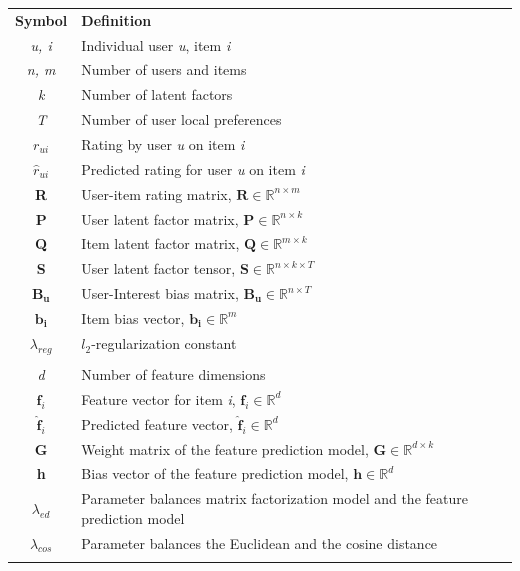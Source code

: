 \begin{table}[p]
	\begin{center}
		\begin{tabularx}{0.9\linewidth}{cX}
			\hline \hline \textbf{Symbol} & \textbf{Definition} \\
			\textit{u, i} & Individual user \textit{u}, item \textit{i} \\
			\textit{n, m} & Number of users and items \\
			\textit{k} & Number of latent factors \\
			\textit{T} & Number of user local preferences \\
			$\mathit{r_{ui}}$ & Rating by user \textit{u} on item \textit{i}\\
			$\mathit{\hat{r}_{ui}}$ & Predicted rating for user \textit{u} on item \textit{i} \\
			\textbf{R} & User-item rating matrix, $\mathbf{R} \in \mathds{R}^{n \times m}$ \\
			\textbf{P} & User latent factor matrix, $\mathbf{P} \in \mathds{R}^{n \times k}$ \\
			\textbf{Q} & Item latent factor matrix, $\mathbf{Q} \in \mathds{R}^{m \times k}$ \\
			\textbf{S} & User latent factor tensor, $\mathbf{S} \in \mathds{R}^{n \times k \times T}$ \\
			$\mathbf{B_u}$ & User-Interest bias matrix, $\mathbf{B_u} \in \mathds{R}^{n \times T}$ \\
			$\mathbf{b_i}$ & Item bias vector, $\mathbf{b_i} \in \mathds{R}^{m}$ \\ 
			$\lambda_{reg}$ & $l_2$-regularization constant\\
			\\
			
			\textit{d} & Number of feature dimensions \\
			$\mathbf{f}_i$ & Feature vector for item \textit{i}, $\mathbf{f}_i \in \mathds{R}^{d}$ \\
			$\mathbf{\hat{f}}_i$ & Predicted feature vector, $\mathbf{\hat{f}}_i \in \mathds{R}^{d}$\\
			\textbf{G} & Weight matrix of the feature prediction model, $\mathbf{G} \in \mathds{R}^{d \times k}$ \\
			\textbf{h} & Bias vector of the feature prediction model, $\mathbf{h} \in \mathds{R}^{d}$ \\
			$\lambda_{ed}$ & Parameter balances matrix factorization model and the feature prediction model \\
			$\lambda_{cos}$ & Parameter balances the Euclidean and the cosine distance \\
			\\
			

\end{tabularx}
\end{center}
\end{table}
